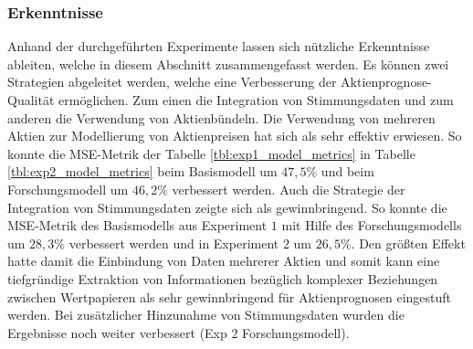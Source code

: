 \subsubsection{Erkenntnisse}\label{sec:evaluierung_insights}
Anhand der durchgeführten Experimente lassen sich nützliche Erkenntnisse ableiten, welche in diesem Abschnitt zusammengefasst werden.
Es können zwei Strategien abgeleitet werden, welche eine Verbesserung der Aktienprognose-Qualität ermöglichen. Zum einen die Integration von Stimmungsdaten und zum anderen die Verwendung von Aktienbündeln. Die Verwendung von mehreren Aktien zur Modellierung von Aktienpreisen hat sich als sehr effektiv erwiesen. So konnte die \ac{MSE}-Metrik der Tabelle \ref{tbl:exp1_model_metrics} in Tabelle \ref{tbl:exp2_model_metrics} beim Basismodell um $47,5\%$ und beim Forschungsmodell um $46,2\%$ verbessert werden. Auch die Strategie der Integration von Stimmungsdaten zeigte sich als gewinnbringend. So konnte die \ac{MSE}-Metrik des Basismodells aus Experiment $1$ mit Hilfe des Forschungsmodells um $28,3\%$ verbessert werden und in Experiment $2$ um $26,5\%$.
Den größten Effekt hatte damit die Einbindung von Daten mehrerer Aktien und somit kann eine tiefgründige Extraktion von Informationen bezüglich komplexer Beziehungen zwischen Wertpapieren als sehr gewinnbringend für Aktienprognosen eingestuft werden.
Bei zusätzlicher Hinzunahme von Stimmungsdaten wurden die Ergebnisse noch weiter verbessert (Exp $2$ Forschungsmodell).


